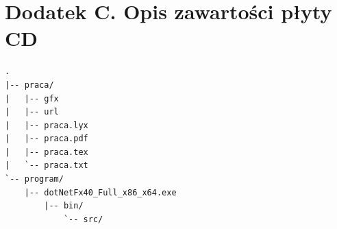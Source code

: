 \documentclass[a4paper,12pt,polish,oneside,openright]{thesis}
\begin{document}
\setlength{\parskip}{\oldparskip}

\chapter*{Dodatek C. Opis zawartości płyty CD}
\label{chap:cd}
\begin{lstlisting}[basicstyle={\small},caption={Struktura plików zamieszczonych na płycie CD}]
.
|-- praca/
|   |-- gfx
|   |-- url
|   |-- praca.lyx
|   |-- praca.pdf
|   |-- praca.tex
|   `-- praca.txt
`-- program/
    |-- dotNetFx40_Full_x86_x64.exe
        |-- bin/
            `-- src/
\end{lstlisting}







\listoffigures
\listoftables
\lstlistoflistings
\end{document}
